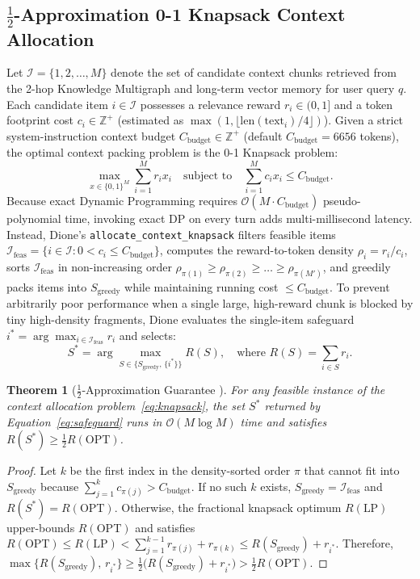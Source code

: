 \documentclass[10pt,a4paper]{article}
\newtheorem{theorem}{Theorem}
\begin{document}
\subsection{\texorpdfstring{$\frac{1}{2}$}{1/2}-Approximation 0-1 Knapsack Context Allocation}
Let $\mathcal{I} = \{1, 2, \dots, M\}$ denote the set of candidate context chunks retrieved from the 2-hop Knowledge Multigraph and long-term vector memory for user query $q$. Each candidate item $i \in \mathcal{I}$ possesses a relevance reward $r_i \in (0, 1]$ and a token footprint cost $c_i \in \mathbb{Z}^+$ (estimated as $\max(1, \lfloor \text{len}(\text{text}_i)/4 \rfloor)$). Given a strict system-instruction context budget $C_{\text{budget}} \in \mathbb{Z}^+$ (default $C_{\text{budget}} = 6656$ tokens), the optimal context packing problem is the 0-1 Knapsack problem:
\begin{equation}
\max_{x \in \{0,1\}^M} \sum_{i=1}^M r_i x_i \quad \text{subject to} \quad \sum_{i=1}^M c_i x_i \le C_{\text{budget}}.
\label{eq:knapsack}
\end{equation}
Because exact Dynamic Programming requires $\mathcal{O}(M \cdot C_{\text{budget}})$ pseudo-polynomial time, invoking exact DP on every turn adds multi-millisecond latency. Instead, Dione's \texttt{allocate\_context\_knapsack} filters feasible items $\mathcal{I}_{\text{feas}} = \{i \in \mathcal{I} : 0 < c_i \le C_{\text{budget}}\}$, computes the reward-to-token density $\rho_i = r_i / c_i$, sorts $\mathcal{I}_{\text{feas}}$ in non-increasing order $\rho_{\pi(1)} \ge \rho_{\pi(2)} \ge \dots \ge \rho_{\pi(M')}$, and greedily packs items into $S_{\text{greedy}}$ while maintaining running cost $\le C_{\text{budget}}$. To prevent arbitrarily poor performance when a single large, high-reward chunk is blocked by tiny high-density fragments, Dione evaluates the single-item safeguard $i^* = \arg\max_{i \in \mathcal{I}_{\text{feas}}} r_i$ and selects:
\begin{equation}
S^* = \arg\max_{S \in \{S_{\text{greedy}},\, \{i^*\}\}} R(S), \quad \text{where } R(S) = \sum_{i \in S} r_i.
\label{eq:safeguard}
\end{equation}

\begin{theorem}[$\frac{1}{2}$-Approximation Guarantee \cite{kellerer2004knapsack}]
For any feasible instance of the context allocation problem~\eqref{eq:knapsack}, the set $S^*$ returned by Equation~\eqref{eq:safeguard} runs in $\mathcal{O}(M \log M)$ time and satisfies $R(S^*) \ge \frac{1}{2} R(\text{OPT})$.
\end{theorem}
\begin{proof}
Let $k$ be the first index in the density-sorted order $\pi$ that cannot fit into $S_{\text{greedy}}$ because $\sum_{j=1}^{k} c_{\pi(j)} > C_{\text{budget}}$. If no such $k$ exists, $S_{\text{greedy}} = \mathcal{I}_{\text{feas}}$ and $R(S^*) = R(\text{OPT})$. Otherwise, the fractional knapsack optimum $R(\text{LP})$ upper-bounds $R(\text{OPT})$ and satisfies $R(\text{OPT}) \le R(\text{LP}) < \sum_{j=1}^{k-1} r_{\pi(j)} + r_{\pi(k)} \le R(S_{\text{greedy}}) + r_{i^*}$. Therefore, $\max\{R(S_{\text{greedy}}),\, r_{i^*}\} \ge \frac{1}{2}\big(R(S_{\text{greedy}}) + r_{i^*}\big) > \frac{1}{2} R(\text{OPT})$.
\end{proof}
\end{document}
